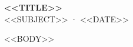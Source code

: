 \documentclass[11pt,a4paper]{article}
\begin{document}
{\Large\bfseries <<TITLE>>}\\[2pt]
{\small <<SUBJECT>> · <<DATE>>}

<<BODY>>
\end{document}
